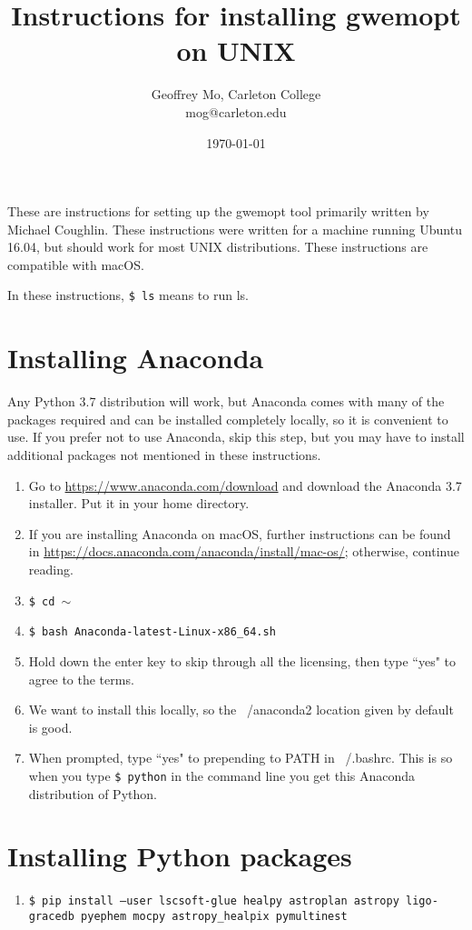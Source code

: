 \documentclass[11pt]{article}
\begin{document}
\title{Instructions for installing gwemopt on UNIX}
\date{\today}
\author{Geoffrey Mo, Carleton College\\mog@carleton.edu}

\maketitle

These are instructions for setting up the gwemopt tool primarily written by Michael Coughlin. These instructions were written for a machine running Ubuntu 16.04, but should work for most UNIX distributions. These instructions are compatible with macOS.

In these instructions, {\tt \$ ls} means to run ls.

\section{Installing Anaconda}
Any Python 3.7 distribution will work, but Anaconda comes with many of the packages required and can be installed completely locally, so it is convenient to use. If you prefer not to use Anaconda, skip this step, but you may have to install additional packages not mentioned in these instructions.

\begin{enumerate}
	\item Go to \url{https://www.anaconda.com/download} and download the Anaconda 3.7 installer. Put it in your home directory.
    \item If you are installing Anaconda on macOS, further instructions can be found in \url{https://docs.anaconda.com/anaconda/install/mac-os/}; otherwise, continue reading.
	\item {\tt \$ cd $\sim$} 
	\item {\tt \$ bash Anaconda-latest-Linux-x86\_64.sh}
	\item Hold down the enter key to skip through all the licensing, then type ``yes" to agree to the terms. 
	\item We want to install this locally, so the ~/anaconda2 location given by default is good.
	\item When prompted, type ``yes" to prepending to PATH in ~/.bashrc. This is so when you type {\tt \$ python} in the command line you get this Anaconda distribution of Python.
\end{enumerate}


\section{Installing Python packages}
\begin{enumerate}
	\item {\tt \$ pip install --user lscsoft-glue healpy astroplan astropy ligo-gracedb pyephem mocpy astropy\_healpix pymultinest}
\end{enumerate}
\end{document}
